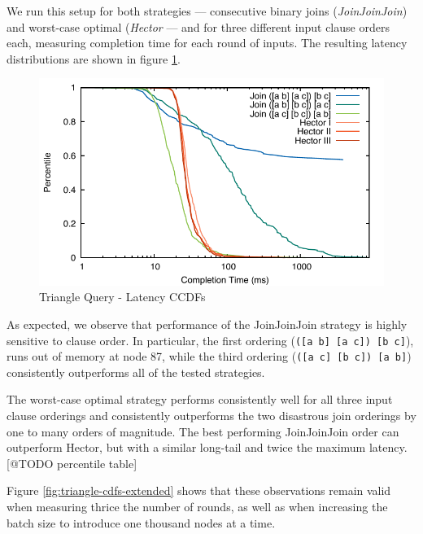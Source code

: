\documentclass[../catalog.tex]{subfiles}
\begin{document}
We run this setup for both strategies — consecutive binary joins
(\emph{JoinJoinJoin}) and worst-case optimal (\emph{Hector} — and for
three different input clause orders each, measuring completion time
for each round of inputs. The resulting latency distributions are
shown in figure \ref{fig:triangle-cdfs}.

\begin{figure}[h!]
  \includegraphics[width=1.0\linewidth]{results/triangles/out/all_cdfs}
  \caption{Triangle Query - Latency CCDFs}
  \label{fig:triangle-cdfs}
\end{figure}

As expected, we observe that performance of the JoinJoinJoin strategy
is highly sensitive to clause order. In particular, the first ordering
(\texttt{([a b] [a c]) [b c]}), runs out of memory at node 87, while
the third ordering (\texttt{([a c] [b c]) [a b]}) consistently
outperforms all of the tested strategies.

The worst-case optimal strategy performs consistently well for all
three input clause orderings and consistently outperforms the two
disastrous join orderings by one to many orders of magnitude. The best
performing JoinJoinJoin order can outperform Hector, but with a
similar long-tail and twice the maximum latency. [@TODO percentile
  table]

Figure \ref{fig:triangle-cdfs-extended} shows that these observations
remain valid when measuring thrice the number of rounds, as well as
when increasing the batch size to introduce one thousand nodes at a
time.
\end{document}

